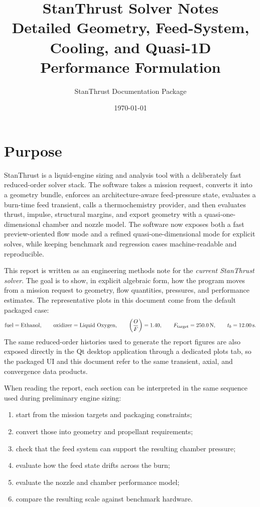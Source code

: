 \documentclass[11pt]{article}
\title{\textbf{StanThrust Solver Notes}\\\large Detailed Geometry, Feed-System, Cooling, and Quasi-1D Performance Formulation}
\author{StanThrust Documentation Package}
\date{\today}
\newcommand{\OF}{\left(\frac{O}{F}\right)}
\begin{document}
\maketitle

\section{Purpose}
StanThrust is a liquid-engine sizing and analysis tool with a deliberately fast reduced-order solver stack. The software takes a mission request, converts it into a geometry bundle, enforces an architecture-aware feed-pressure state, evaluates a burn-time feed transient, calls a thermochemistry provider, and then evaluates thrust, impulse, structural margins, and export geometry with a quasi-one-dimensional chamber and nozzle model. The software now exposes both a fast preview-oriented flow mode and a refined quasi-one-dimensional mode for explicit solves, while keeping benchmark and regression cases machine-readable and reproducible.

This report is written as an engineering methods note for the \emph{current StanThrust solver}. The goal is to show, in explicit algebraic form, how the program moves from a mission request to geometry, flow quantities, pressures, and performance estimates. The representative plots in this document come from the default packaged case:
\[
\text{fuel}=\text{\SampleFuel}, \qquad
\text{oxidizer}=\text{\SampleOxidizer}, \qquad
\OF=\SampleMixtureRatio, \qquad
F_{\text{target}}=\SI{\SampleTargetThrust}{N}, \qquad
t_b=\SI{\SampleBurnTime}{s}.
\]
The same reduced-order histories used to generate the report figures are also exposed directly in the Qt desktop application through a dedicated plots tab, so the packaged UI and this document refer to the same transient, axial, and convergence data products.

When reading the report, each section can be interpreted in the same sequence used during preliminary engine sizing:
\begin{enumerate}[leftmargin=6mm]
\item start from the mission targets and packaging constraints;
\item convert those into geometry and propellant requirements;
\item check that the feed system can support the resulting chamber pressure;
\item evaluate how the feed state drifts across the burn;
\item evaluate the nozzle and chamber performance model;
\item compare the resulting scale against benchmark hardware.
\end{enumerate}
\end{document}
